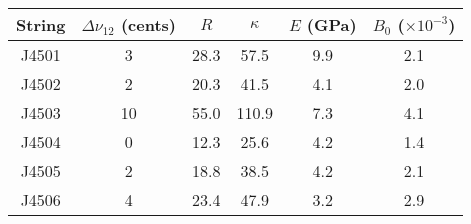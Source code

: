 \begin{tabular}{cccccc}
\toprule
String &  $\Delta \nu_{12}$ (cents) &  $R$ &  $\kappa$ &  $E$ (GPa) &  $B_0$ ($\times 10^{-3}$) \\
\midrule
 J4501 &                          3 & 28.3 &      57.5 &        9.9 &                       2.1 \\
 J4502 &                          2 & 20.3 &      41.5 &        4.1 &                       2.0 \\
 J4503 &                         10 & 55.0 &     110.9 &        7.3 &                       4.1 \\
 J4504 &                          0 & 12.3 &      25.6 &        4.2 &                       1.4 \\
 J4505 &                          2 & 18.8 &      38.5 &        4.2 &                       2.1 \\
 J4506 &                          4 & 23.4 &      47.9 &        3.2 &                       2.9 \\
\bottomrule
\end{tabular}

